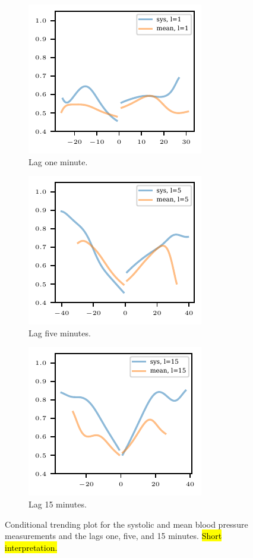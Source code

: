 \begin{figure}
    \centering
    \begin{subfigure}[t]{.32\textwidth}
        \includegraphics{plots/mimic/cond_prob_diff_nbp_abp_lag1}
        \caption{Lag one minute.}
    \end{subfigure}\hspace{0.01\textwidth}
    \begin{subfigure}[t]{.32\textwidth}
        \includegraphics{plots/mimic/cond_prob_diff_nbp_abp_lag5}
        \caption{Lag five minutes.}
    \end{subfigure}\hspace{0.01\textwidth}
    \begin{subfigure}[t]{.32\textwidth}
        \includegraphics{plots/mimic/cond_prob_diff_nbp_abp_lag15}
        \caption{Lag 15 minutes.}
    \end{subfigure}\hspace{0.01\textwidth}
    \caption{Conditional trending plot for the systolic and mean blood pressure measurements and the lags one, five, and 15 minutes. \hl{Short interpretation.}}
    \label{fig:app-mimic-cond-prob}
\end{figure}





